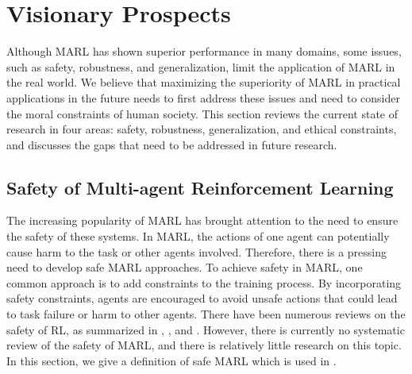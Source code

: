 \documentclass[acmsmall]{acmart}
\begin{document}



\section{Visionary Prospects} \label{Visionary}
Although MARL has shown superior performance in many domains, some issues, such as safety, robustness, and generalization, limit the application of MARL in the real world. We believe that maximizing the superiority of MARL in practical applications in the future needs to first address these issues and need to consider the moral constraints of human society. %
This section reviews the current state of research in four areas: safety, robustness, generalization, and ethical constraints, and discusses the gaps that need to be addressed in future research.

\subsection{Safety of Multi-agent Reinforcement Learning}
The increasing popularity of MARL has brought attention to the need to ensure the safety of these systems. In MARL, the actions of one agent can potentially cause harm to the task or other agents involved. Therefore, there is a pressing need to develop safe MARL approaches. To achieve safety in MARL, one common approach is to add constraints to the training process. By incorporating safety constraints, agents are encouraged to avoid unsafe actions that could lead to task failure or harm to other agents. 
There have been numerous reviews on the safety of RL, as summarized in \cite{JMLR:v16:garcia15a}, \cite{gu2022review}, and \cite{trustRL}. However, there is currently no systematic review of the safety of MARL, and there is relatively little research on this topic. In this section, we give a definition of safe MARL which is used in \cite{gu2021multi}.
\end{document}
